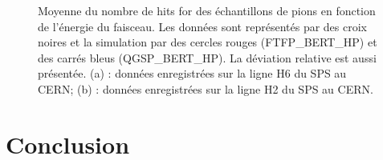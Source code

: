 \begin{figure}[!ht]
  \caption{Moyenne du nombre de hits for des échantillons de pions en fonction de l'énergie du faisceau. Les données sont représentés par des croix noires et la simulation par des cercles rouges (FTFP\_BERT\_HP) et des carrés bleus (QGSP\_BERT\_HP). La déviation relative est aussi présentée. (a) : données enregistrées sur la ligne H6 du SPS au CERN; (b) : données enregistrées sur la ligne H2 du SPS au CERN.}
  \label{fig.nhit_pi-_ebeam}
\end{figure}


\section{Conclusion}
